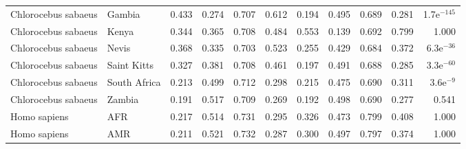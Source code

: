 \begin{longtable}{llrrrrrrrrr}
 Chlorocebus sabaeus &                    Gambia &                              0.433 &                               0.274 &                 0.707 &                 0.612 &                              0.194 &                               0.495 &                 0.689 &                 0.281 & 1.7e$^{-145}$ \\
 Chlorocebus sabaeus &                     Kenya &                              0.344 &                               0.365 &                 0.708 &                 0.484 &                              0.553 &                               0.139 &                 0.692 &                 0.799 &         1.000 \\
 Chlorocebus sabaeus &                     Nevis &                              0.368 &                               0.335 &                 0.703 &                 0.523 &                              0.255 &                               0.429 &                 0.684 &                 0.372 &  6.3e$^{-36}$ \\
 Chlorocebus sabaeus &               Saint Kitts &                              0.327 &                               0.381 &                 0.708 &                 0.461 &                              0.197 &                               0.491 &                 0.688 &                 0.285 &  3.3e$^{-60}$ \\
 Chlorocebus sabaeus &              South Africa &                              0.213 &                               0.499 &                 0.712 &                 0.298 &                              0.215 &                               0.475 &                 0.690 &                 0.311 &   3.6e$^{-9}$ \\
 Chlorocebus sabaeus &                    Zambia &                              0.191 &                               0.517 &                 0.709 &                 0.269 &                              0.192 &                               0.498 &                 0.690 &                 0.277 &         0.541 \\
        Homo sapiens &                       AFR &                              0.217 &                               0.514 &                 0.731 &                 0.295 &                              0.326 &                               0.473 &                 0.799 &                 0.408 &         1.000 \\
        Homo sapiens &                       AMR &                              0.211 &                               0.521 &                 0.732 &                 0.287 &                              0.300 &                               0.497 &                 0.797 &                 0.374 &         1.000 \\

\end{longtable}
